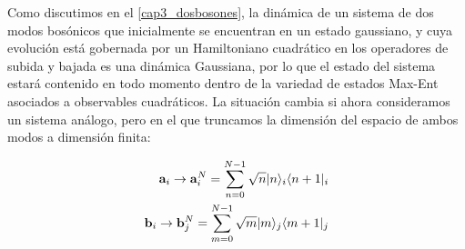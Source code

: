 \documentclass{report} %
\newcommand{\notamm}[1]{{\color{orange} [Comentario MM: #1]}}
\numberwithin{equation}{section}
\begin{document}

Como discutimos en el  \autoref{cap3_dosbosones}, la dinámica de un sistema de dos modos bosónicos que inicialmente se encuentran en un estado gaussiano, y cuya evolución está gobernada por un Hamiltoniano cuadrático en los operadores de subida y bajada es una dinámica Gaussiana, por lo que el estado del sistema estará contenido en todo momento dentro de la variedad de estados Max-Ent asociados a observables cuadráticos. La situación cambia si ahora consideramos un sistema análogo, pero en el que truncamos la dimensión del espacio de ambos modos a dimensión finita:

\begin{subequations}
\begin{align}
{\bf a}_{i}\rightarrow {\bf a}^{N}_{i}=\sum_{n=0}^{N-1}\sqrt{n}|n\rangle_i \langle n+1|_i \\
{\bf b}_{i}\rightarrow {\bf b}^{N}_{j}=\sum_{m=0}^{N-1}\sqrt{m}|m\rangle_j \langle m+1|_j
\end{align}
\end{subequations}
\end{document}
